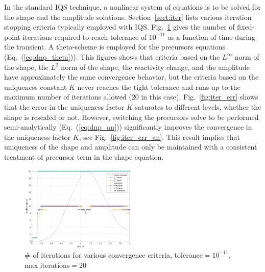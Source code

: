 \documentclass{elsarticle}
\newcommand{\eqt}[1]{Eq.~(\ref{#1})}                     %
\newcommand{\fig}[1]{Fig.~\ref{#1}}                      %
\newcommand{\sct}[1]{Section~\ref{#1}}                   %
\begin{document}
In the standard IQS technique, a nonlinear system of equations is to be solved for the shape and the amplitude solutions. \sct{sect:iter} lists various iteration stopping criteria typically employed with IQS. \fig{fig:iter} gives the number of fixed-point iterations required to reach tolerance of $10^{-11}$ as a function of time during the transient. A theta-scheme is employed for the precursors equations (\eqt{eq:dnp_theta}).
This figures shows that criteria based on the  $L^{\infty}$ norm of the shape, the $L^2$ norm of the shape, the reactivity change, and the amplitude have approximately the same convergence behavior, but the criteria based on the uniqueness constant $K$ never reaches the tight tolerance and runs up to the maximum number of iterations allowed (20 in this case). \fig{fig:iter_err} shows that the error in the uniqueness factor $K$ saturates to different levels, whether the shape is rescaled or not.
However, switching the precursors solve to be performed semi-analytically (\eqt{eq:dnp_an}) significantly improves the convergence in the uniqueness factor $K$, see \fig{fig:iter_err_an}. This result implies that uniqueness of the shape and amplitude can only be maintained with a consistent treatment of precursor term in the shape equation.

\begin{figure}[!htbp]
\centering
\includegraphics[width=0.49\textwidth]{figures/iter_renorm.png}
\caption{\# of iterations for various convergence criteria, tolerance$=10^{-11}$, max iterations$=20$}
\label{fig:iter}
\end{figure}
\end{document}
